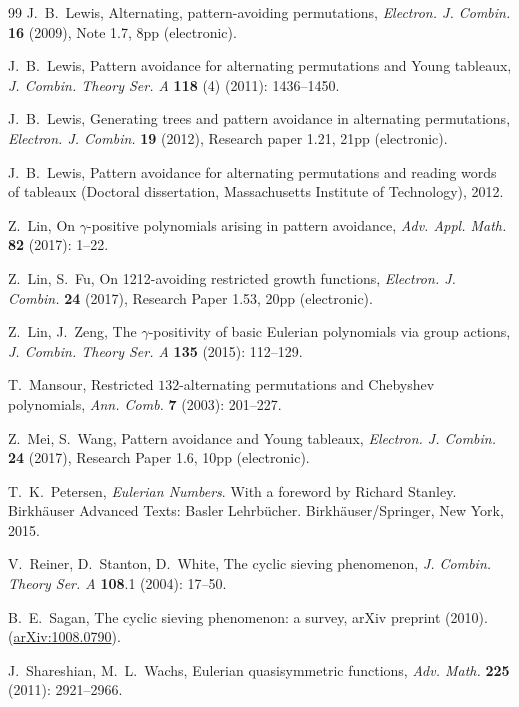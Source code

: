 \documentclass[12pt,reqno]{amsart}
\numberwithin{equation}{section}
\theoremstyle{plain}
\theoremstyle{definition}
\begin{document}
\begin{thebibliography}{99}
 J.~B.~Lewis, Alternating, pattern-avoiding permutations, \textit{Electron. J. Combin.} {\bf 16} (2009), Note 1.7, 8pp (electronic).

 J.~B.~Lewis, Pattern avoidance for alternating permutations and Young tableaux, \textit{J. Combin. Theory Ser. A} {\bf 118} (4) (2011): 1436--1450.

 J.~B.~Lewis, Generating trees and pattern avoidance in alternating permutations, \textit{Electron. J. Combin.} {\bf 19} (2012), Research paper 1.21, 21pp (electronic).

 J.~B.~Lewis, Pattern avoidance for alternating permutations and reading words of tableaux (Doctoral dissertation, Massachusetts Institute of Technology), 2012.

Z.~Lin, On $\gamma$-positive polynomials arising in pattern avoidance, \textit{Adv. Appl. Math.} {\bf 82} (2017): 1--22.

 Z.~Lin, S.~Fu, On 1212-avoiding restricted growth functions, \textit{Electron. J. Combin.} {\bf24} (2017), Research Paper 1.53, 20pp (electronic).

 Z.~Lin, J.~Zeng, The $\gamma$-positivity of basic Eulerian polynomials via group actions, \textit{J. Combin. Theory Ser. A} {\bf 135} (2015): 112--129.

 T.~Mansour, Restricted $132$-alternating permutations and Chebyshev polynomials, \textit{Ann. Comb.} {\bf 7} (2003): 201--227.

 Z.~Mei, S.~Wang, Pattern avoidance and Young tableaux, \textit{Electron. J. Combin.} {\bf 24} (2017), Research Paper 1.6, 10pp (electronic).

T.~K.~Petersen,  \textit{Eulerian Numbers}. With a foreword by Richard Stanley. Birkh\"auser Advanced Texts: Basler Lehrb\"ucher. Birkh\"auser/Springer, New York, 2015.

V.~Reiner, D.~Stanton, D.~White, The cyclic sieving phenomenon, \textit{J. Combin. Theory Ser. A} {\bf 108}.1 (2004): 17--50.






 B.~E.~Sagan, The cyclic sieving phenomenon: a survey, arXiv preprint (2010). (\href{http://arxiv.org/abs/1008.0790}{arXiv:1008.0790}).

 J.~Shareshian, M.~L.~Wachs, Eulerian quasisymmetric functions, \textit{Adv. Math.} {\bf 225} (2011): 2921--2966.


\end{thebibliography}
\end{document}
